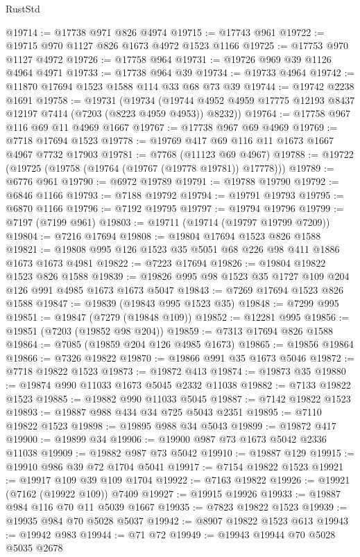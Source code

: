 \begin{lexlean}{RustStd}
\begin{coremodule}
@19714 := @17738 @971 @826 @4974
@19715 := @17743 @961
@19722 := @19715 @970 @1127 @826 @1673 @4972 @1523 @1166
@19725 := @17753 @970 @1127 @4972
@19726 := @17758 @964
@19731 := @19726 @969 @39 @1126 @4964 @4971
@19733 := @17738 @964 @39
@19734 := @19733 @4964
@19742 := @11870 @17694 @1523 @1588 @114 @33 @68 @73 @39
@19744 := @19742 @2238 @1691
@19758 := @19731
    (@19734 (@19744 @4952 @4959 @17775 @12193 @8437 @12197 @7414 (@7203 (@8223 @4959 @4953)) @8232))
@19764 := @17758 @967 @116 @69 @11 @4969 @1667
@19767 := @17738 @967 @69 @4969
@19769 := @7718 @17694 @1523
@19778 := @19769 @417 @69 @116 @11 @1673 @1667 @4967 @7732 @17903
@19781 := @7768 (@11123 @69 @4967)
@19788 := @19722 (@19725 (@19758 (@19764 (@19767 (@19778 @19781)) @17778)))
@19789 := @6776 @961
@19790 := @6972 @19789
@19791 := @19788 @19790
@19792 := @6846 @1166
@19793 := @7188 @19792
@19794 := @19791 @19793
@19795 := @6870 @1166
@19796 := @7192 @19795
@19797 := @19794 @19796
@19799 := @7197 (@7199 @961)
@19803 := @19711 (@19714 (@19797 @19799 @7209))
@19804 := @7216 @17694
@19808 := @19804 @17694 @1523 @826 @1588
@19821 := @19808 @995 @126 @1523 @35 @5051 @68 @226 @98 @411 @1886 @1673 @1673 @4981
@19822 := @7223 @17694
@19826 := @19804 @19822 @1523 @826 @1588
@19839 := @19826 @995 @98 @1523 @35 @1727 @109 @204 @126 @991 @4985 @1673 @1673 @5047
@19843 := @7269 @17694 @1523 @826 @1588
@19847 := @19839 (@19843 @995 @1523 @35)
@19848 := @7299 @995
@19851 := @19847 (@7279 (@19848 @109))
@19852 := @12281 @995
@19856 := @19851 (@7203 (@19852 @98 @204))
@19859 := @7313 @17694 @826 @1588
@19864 := @7085 (@19859 @204 @126 @4985 @1673)
@19865 := @19856 @19864
@19866 := @7326 @19822
@19870 := @19866 @991 @35 @1673 @5046
@19872 := @7718 @19822 @1523
@19873 := @19872 @413
@19874 := @19873 @35
@19880 := @19874 @990 @11033 @1673 @5045 @2332 @11038
@19882 := @7133 @19822 @1523
@19885 := @19882 @990 @11033 @5045
@19887 := @7142 @19822 @1523
@19893 := @19887 @988 @434 @34 @725 @5043 @2351
@19895 := @7110 @19822 @1523
@19898 := @19895 @988 @34 @5043
@19899 := @19872 @417
@19900 := @19899 @34
@19906 := @19900 @987 @73 @1673 @5042 @2336 @11038
@19909 := @19882 @987 @73 @5042
@19910 := @19887 @129
@19915 := @19910 @986 @39 @72 @1704 @5041
@19917 := @7154 @19822 @1523
@19921 := @19917 @109 @39 @109 @1704
@19922 := @7163 @19822
@19926 := @19921 (@7162 (@19922 @109)) @7409
@19927 := @19915 @19926
@19933 := @19887 @984 @116 @70 @11 @5039 @1667
@19935 := @7823 @19822 @1523
@19939 := @19935 @984 @70 @5028 @5037
@19942 := @8907 @19822 @1523 @613
@19943 := @19942 @983
@19944 := @71 @72
@19949 := @19943 @19944 @70 @5028 @5035 @2678

\end{coremodule}
\end{lexlean}
